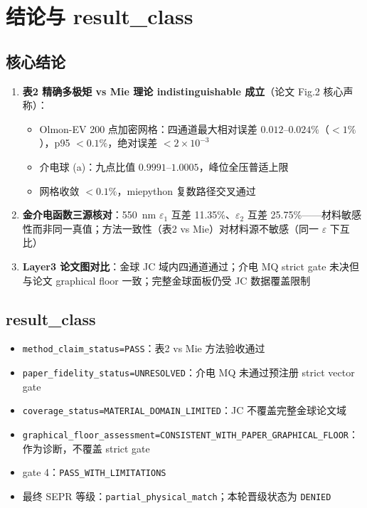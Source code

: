 \section{结论与 result\_class}

\subsection{核心结论}

\begin{enumerate}
  \item \textbf{表2 精确多极矩 vs Mie 理论 indistinguishable 成立}（论文 Fig.2 核心声称）：
    \begin{itemize}
      \item Olmon-EV 200 点加密网格：四通道最大相对误差 $0.012$--$0.024\%$（$<1\%$），p95 $<0.1\%$，绝对误差 $<2\times10^{-3}$
      \item 介电球 (a)：九点比值 $0.9991$--$1.0005$，峰位全压普适上限
      \item 网格收敛 $<0.1\%$，miepython 复数路径交叉通过
    \end{itemize}
  \item \textbf{金介电函数三源核对}：550~nm $\varepsilon_1$ 互差 11.35\%、$\varepsilon_2$ 互差 25.75\%——材料敏感性而非同一真值；方法一致性（表2 vs Mie）对材料源不敏感（同一 $\varepsilon$ 下互比）
  \item \textbf{Layer3 论文图对比}：金球 JC 域内四通道通过；介电 MQ strict gate 未决但与论文 graphical floor 一致；完整金球面板仍受 JC 数据覆盖限制
\end{enumerate}

\subsection{result\_class}

\begin{itemize}
  \footnotesize
  \raggedright
  \setlength{\itemsep}{0.15em}
  \setlength{\parsep}{0pt}
  \setlength{\parskip}{0pt}
  \item \texttt{method\_claim\_status=PASS}：表2 vs Mie 方法验收通过
  \item \texttt{paper\_fidelity\_status=UNRESOLVED}：介电 MQ 未通过预注册 strict vector gate
  \item \texttt{coverage\_status=MATERIAL\_DOMAIN\_LIMITED}：JC 不覆盖完整金球论文域
  \item \texttt{graphical\_floor\_assessment=CONSISTENT\_WITH\_PAPER\_GRAPHICAL\_FLOOR}：作为诊断，不覆盖 strict gate
  \item gate 4：\texttt{PASS\_WITH\_LIMITATIONS}
  \item 最终 SEPR 等级：\texttt{partial\_physical\_match}；本轮晋级状态为 \texttt{DENIED}
\end{itemize}

